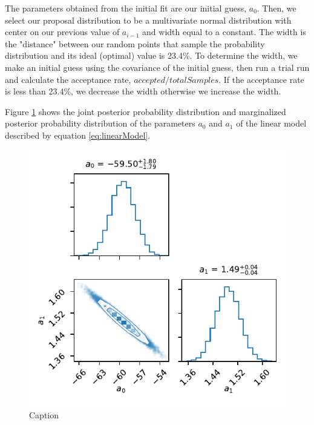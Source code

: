 The parameters obtained from the initial fit are our initial guess, $a_0$. 
Then, we select our proposal distribution to be a multivariate normal distribution with center on our previous value of $a_{i-1}$ and width equal to a constant.
The width is the "distance" between our random points that sample the probability distribution and its ideal (optimal) value is 23.4\%.
To determine the width, we make an initial guess using the covariance of the initial guess, then run a trial run and calculate the acceptance rate, $accepted/totalSamples$.
If the acceptance rate is less than 23.4\%, we decrease the width otherwise we increase the width. 

Figure \ref{fig:LinearHastings} shows the joint posterior probability distribution and marginalized posterior probability distribution of the parameters $a_0$ and $a_1$ of the linear model described by equation \ref{eq:linearModel}. 


\begin{figure}
    \centering
    \includegraphics{CodeAndFigures/LinearModelMetropolisHastings.pdf}
    \caption{Caption}
    \label{fig:LinearHastings}
\end{figure}